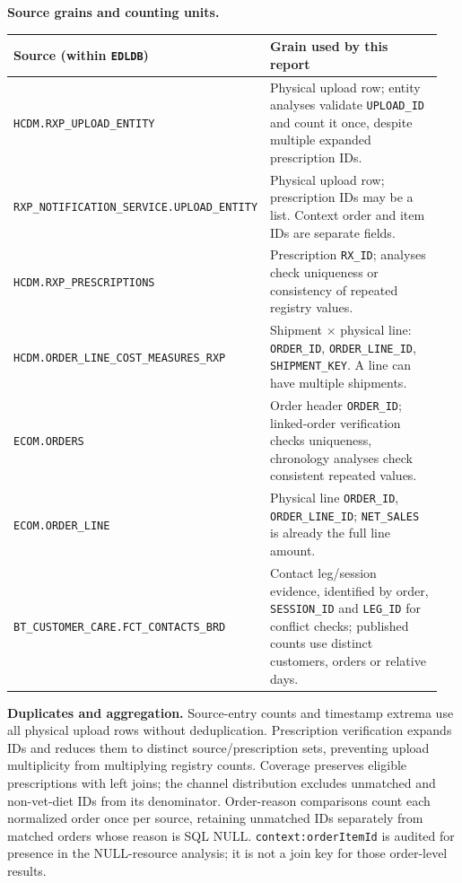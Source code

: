 \clearpage
\noindent\textbf{Source grains and counting units.}
\begin{longtable}{@{}>{\raggedright\arraybackslash}p{0.36\linewidth}>{\raggedright\arraybackslash}p{0.59\linewidth}@{}}
\toprule
Source (within \texttt{EDLDB}) & Grain used by this report \\
\midrule
\endhead
\texttt{HCDM.RXP\_UPLOAD\_ENTITY} & Physical upload row; entity analyses validate \texttt{UPLOAD\_ID} and count it once, despite multiple expanded prescription IDs. \\
\texttt{RXP\_NOTIFICATION\_SERVICE.}\allowbreak\texttt{UPLOAD\_ENTITY} & Physical upload row; prescription IDs may be a list. Context order and item IDs are separate fields. \\
\texttt{HCDM.RXP\_PRESCRIPTIONS} & Prescription \texttt{RX\_ID}; analyses check uniqueness or consistency of repeated registry values. \\
\texttt{HCDM.ORDER\_LINE\_COST\_}\allowbreak\texttt{MEASURES\_RXP} & Shipment $\times$ physical line: \texttt{ORDER\_ID}, \texttt{ORDER\_LINE\_ID}, \texttt{SHIPMENT\_KEY}. A line can have multiple shipments. \\
\texttt{ECOM.ORDERS} & Order header \texttt{ORDER\_ID}; linked-order verification checks uniqueness, chronology analyses check consistent repeated values. \\
\texttt{ECOM.ORDER\_LINE} & Physical line \texttt{ORDER\_ID}, \texttt{ORDER\_LINE\_ID}; \texttt{NET\_SALES} is already the full line amount. \\
\texttt{BT\_CUSTOMER\_CARE.}\allowbreak\texttt{FCT\_CONTACTS\_BRD} & Contact leg/session evidence, identified by order, \texttt{SESSION\_ID} and \texttt{LEG\_ID} for conflict checks; published counts use distinct customers, orders or relative days. \\
\bottomrule
\end{longtable}

\noindent\textbf{Duplicates and aggregation.}
Source-entry counts and timestamp extrema use all physical upload rows without
deduplication. Prescription verification expands IDs and reduces them to distinct
source/prescription sets, preventing upload multiplicity from multiplying registry
counts. Coverage preserves eligible prescriptions with left joins; the channel
distribution excludes unmatched and non-vet-diet IDs from its denominator.
Order-reason comparisons count each normalized order once per source, retaining
unmatched IDs separately from matched orders whose reason is SQL NULL.
\texttt{context:orderItemId} is audited for presence in the NULL-resource analysis;
it is not a join key for those order-level results.

